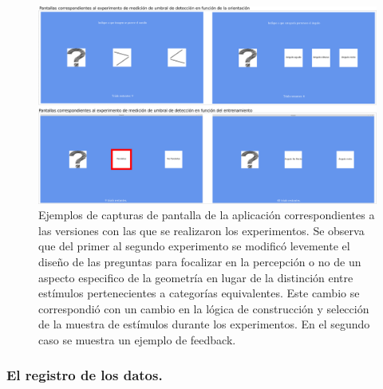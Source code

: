 \documentclass{article}
\numberwithin{figure}{section}
\begin{document}
    \begin{figure}
        \center
        \includegraphics[width=\textwidth]{Imagenes/Pantallas2.png}
        \caption{Ejemplos de  capturas de pantalla de la aplicación correspondientes a las versiones con las que se realizaron los experimentos. Se observa que del primer al segundo experimento se modificó levemente el diseño de las preguntas para focalizar en la percepción o no de un aspecto especifico de la geometría en lugar de la distinción entre estímulos pertenecientes a categorías equivalentes. Este cambio se correspondió con un cambio en la lógica de construcción y selección de la muestra de estímulos durante los experimentos. En el segundo caso se muestra un ejemplo de feedback.}
        
        \label{fig:Pantallas2}
    \end{figure}
    
    \subsubsection{El registro de los datos.}
    
\end{document}

